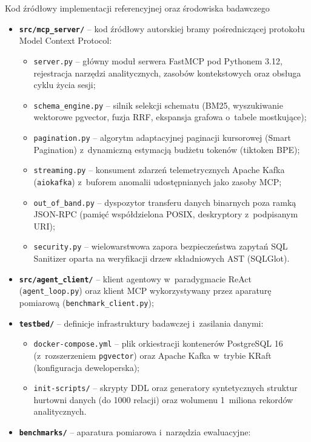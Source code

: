 \begin{easyappendix}{Kod źródłowy implementacji referencyjnej oraz środowiska badawczego}
\begin{itemize}
    \item \textbf{\texttt{src/mcp\_server/}} -- kod źródłowy autorskiej bramy pośredniczącej protokołu Model Context Protocol:
    \begin{itemize}
        \item \texttt{server.py} -- główny moduł serwera FastMCP pod Pythonem 3.12, rejestracja narzędzi analitycznych, zasobów kontekstowych oraz obsługa cyklu życia sesji;
        \item \texttt{schema\_engine.py} -- silnik selekcji schematu (BM25, wyszukiwanie wektorowe pgvector, fuzja RRF, ekspansja grafowa o~tabele mostkujące);
        \item \texttt{pagination.py} -- algorytm adaptacyjnej paginacji kursorowej (Smart Pagination) z~dynamiczną estymacją budżetu tokenów (tiktoken BPE);
        \item \texttt{streaming.py} -- konsument zdarzeń telemetrycznych Apache Kafka (\texttt{aiokafka}) z~buforem anomalii udostępnianych jako zasoby MCP;
        \item \texttt{out\_of\_band.py} -- dyspozytor transferu danych binarnych poza ramką JSON-RPC (pamięć współdzielona POSIX, deskryptory z~podpisanym URI);
        \item \texttt{security.py} -- wielowarstwowa zapora bezpieczeństwa zapytań SQL Sanitizer oparta na weryfikacji drzew składniowych AST (SQLGlot).
    \end{itemize}
    \item \textbf{\texttt{src/agent\_client/}} -- klient agentowy w~paradygmacie ReAct (\texttt{agent\_loop.py}) oraz klient MCP wykorzystywany przez aparaturę pomiarową (\texttt{benchmark\_client.py});
    \item \textbf{\texttt{testbed/}} -- definicje infrastruktury badawczej i~zasilania danymi:
    \begin{itemize}
        \item \texttt{docker-compose.yml} -- plik orkiestracji kontenerów PostgreSQL 16 (z~rozszerzeniem \texttt{pgvector}) oraz Apache Kafka w~trybie KRaft (konfiguracja deweloperska);
        \item \texttt{init-scripts/} -- skrypty DDL oraz generatory syntetycznych struktur hurtowni danych (do 1000 relacji) oraz wolumenu 1~miliona rekordów analitycznych.
    \end{itemize}
    \item \textbf{\texttt{benchmarks/}} -- aparatura pomiarowa i~narzędzia ewaluacyjne:

\end{itemize}
\end{easyappendix}
